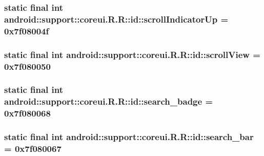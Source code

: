 \hypertarget{classandroid_1_1support_1_1coreui_1_1_r_1_1id_34cc1ba3f7c7c3d4c22afd6abe99110f}{
\subsubsection[{scrollIndicatorUp}]{\setlength{\rightskip}{0pt plus 5cm}static final int android::support::coreui.R.R::id::scrollIndicatorUp = 0x7f08004f}}
\label{classandroid_1_1support_1_1coreui_1_1_r_1_1id_34cc1ba3f7c7c3d4c22afd6abe99110f}


\hypertarget{classandroid_1_1support_1_1coreui_1_1_r_1_1id_b342b1adbd69b7ce9d1d218d8c0cd1a4}{
\subsubsection[{scrollView}]{\setlength{\rightskip}{0pt plus 5cm}static final int android::support::coreui.R.R::id::scrollView = 0x7f080050}}
\label{classandroid_1_1support_1_1coreui_1_1_r_1_1id_b342b1adbd69b7ce9d1d218d8c0cd1a4}


\hypertarget{classandroid_1_1support_1_1coreui_1_1_r_1_1id_bb1921013fe575caa9f4765acda47875}{
\subsubsection[{search\_\-badge}]{\setlength{\rightskip}{0pt plus 5cm}static final int android::support::coreui.R.R::id::search\_\-badge = 0x7f080068}}
\label{classandroid_1_1support_1_1coreui_1_1_r_1_1id_bb1921013fe575caa9f4765acda47875}


\hypertarget{classandroid_1_1support_1_1coreui_1_1_r_1_1id_a28e42524cc1d9376d2075c9fa76432e}{
\subsubsection[{search\_\-bar}]{\setlength{\rightskip}{0pt plus 5cm}static final int android::support::coreui.R.R::id::search\_\-bar = 0x7f080067}}
\label{classandroid_1_1support_1_1coreui_1_1_r_1_1id_a28e42524cc1d9376d2075c9fa76432e}


